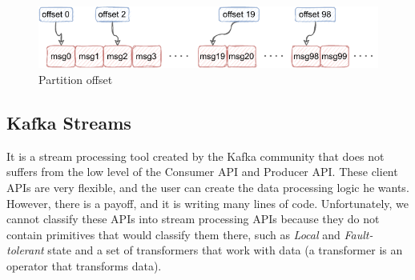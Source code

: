 \begin{enumerate}
    \begin{figure}[!ht]
    \centering
    \includegraphics[scale=1.1]{obrazky-figures/02-preliminaries/02-kafka/05-offset-thing.pdf}
    \caption{Partition offset}
    \label{fig:offset}
    \end{figure}
\end{enumerate}

\subsection*{Kafka Streams}

It is a stream processing tool created by the Kafka community that does not suffers from the low level of the Consumer API and Producer API. These client APIs are very flexible, and the user can create the data processing logic he wants. However, there is a payoff, and it is writing many lines of code. Unfortunately, we cannot classify these APIs into stream processing APIs because they do not contain primitives that would classify them there, such as \emph{Local} and \emph{Fault-tolerant} state and a set of transformers that work with data (a transformer is an operator that transforms data).

